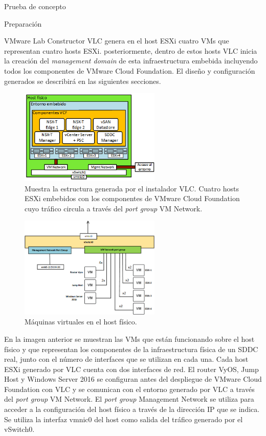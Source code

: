 \begin{section}{Prueba de concepto}
\begin{subsection}{Preparación}
  \begin{subsubsection}{VMware Lab Constructor}
    VLC genera en el host ESXi cuatro VMs que representan cuatro hosts ESXi. posteriormente, dentro de estos hosts VLC inicia la creación del \textit{management domain} de esta infraestructura embebida incluyendo todos los componentes de VMware Cloud Foundation. El diseño y configuración generados se describirá en las siguientes secciones.
    \begin{figure}[h!]
      \centering
      \includegraphics[width=0.6\textwidth]{imaxes/pruebaconcepto/hostFisico.png}
      \caption{Muestra la estructura generada por el instalador VLC. Cuatro hosts ESXi embebidos con los componentes de VMware Cloud Foundation cuyo tráfico circula a través del \textit{port group} VM Network.}
      \label{fig:estructura-generada-por-VLC}
    \end{figure}
    \FloatBarrier

    \begin{figure}[h]
      \centering
      \includegraphics[width=0.6\textwidth]{imaxes/pruebaconcepto/vSwitch0HostFisico.png}
      \caption{Máquinas virtuales en el host físico.}
      \label{fig:VMs-alojadas-host-fisico}
    \end{figure}
    \FloatBarrier

    En la imagen anterior se muestran las VMs que están funcionando sobre el host físico y que representan los componentes de la infraestructura física de un SDDC real, junto con el número de interfaces que se utilizan en cada una. Cada host ESXi generado por VLC cuenta con dos interfaces de red. El router VyOS, Jump Host y Windows Server 2016 se configuran antes del despliegue de VMware Cloud Foundation con VLC y se comunican con el entorno generado por VLC a través del \textit{port group} VM Network. El \textit{port group} Management Network se utiliza para acceder a la configuración del host físico a través de la dirección IP que se indica. Se utiliza la interfaz vmnic0 del host como salida del tráfico generado por el vSwitch0.
    \FloatBarrier


\end{subsubsection}
\end{subsection}
\end{section}
